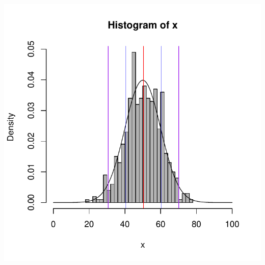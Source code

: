 \documentclass{beamer}\usepackage[]{graphicx}\usepackage[]{color}
\newenvironment{knitrout}{}{} %
\renewenvironment{knitrout}{\setlength{\topsep}{0mm}}{}
\begin{document}
\begin{frame}[fragile]
\begin{columns}[c]
\centering
\begin{knitrout}
\color{fgcolor}
\includegraphics[width=1.1\linewidth]{figure/unnamed-chunk-4-1} 

\end{knitrout}

\end{columns}

\end{frame} 
\end{document}
